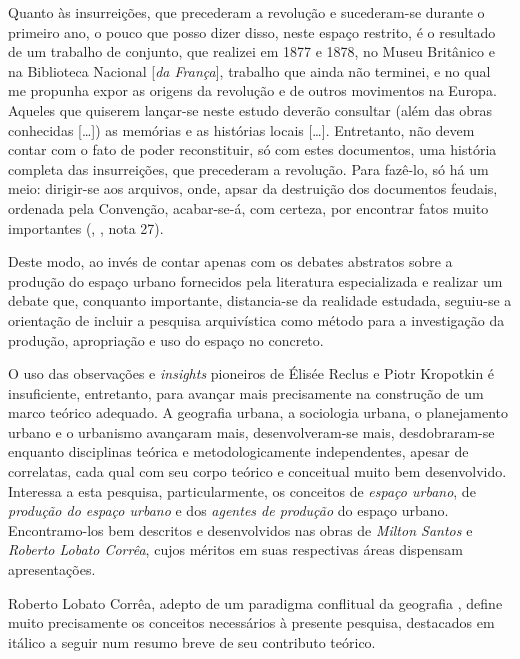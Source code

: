 \begin{citacao}
Quanto às insurreições, que precederam a revolução e sucederam-se durante o primeiro ano, o pouco que posso dizer disso, neste espaço restrito, é o resultado de um trabalho de conjunto, que realizei em 1877 e 1878, no Museu Britânico e na Biblioteca Nacional [\textit{da França}], trabalho que ainda não terminei, e no qual me propunha expor as origens da revolução e de outros movimentos na Europa. Aqueles que quiserem lançar-se neste estudo deverão consultar (além das obras conhecidas [{\dots}]) as memórias e as histórias locais [{\dots}]. Entretanto, não devem contar com o fato de poder reconstituir, só com estes documentos, uma história completa das insurreições, que precederam a revolução. Para fazê-lo, só há um meio: dirigir-se aos arquivos, onde, apsar da destruição dos documentos feudais, ordenada pela Convenção, acabar-se-á, com certeza, por encontrar fatos muito importantes (\citeauthor{KROPOTKIN2005f}, \citeyear{KROPOTKIN2005f},  nota 27).
\end{citacao}

Deste modo, ao invés de contar apenas com os debates abstratos sobre a produção do espaço urbano fornecidos pela literatura especializada e realizar um debate que, conquanto importante, distancia-se da realidade estudada, seguiu-se a orientação de incluir a pesquisa arquivística como método para a investigação da produção, apropriação e uso do espaço no concreto.

O uso das observações e \textit{insights} pioneiros de Élisée Reclus e Piotr Kropotkin é insuficiente, entretanto, para avançar mais precisamente na construção de um marco teórico adequado. A geografia urbana, a sociologia urbana, o planejamento urbano e o urbanismo avançaram mais, desenvolveram-se mais, desdobraram-se enquanto disciplinas teórica e metodologicamente independentes, apesar de correlatas, cada qual com seu corpo teórico e conceitual muito bem desenvolvido. Interessa a esta pesquisa, particularmente, os conceitos de \textit{espaço urbano}, de \textit{produção do espaço urbano} e dos \textit{agentes de produção} do espaço urbano. Encontramo-los bem descritos e desenvolvidos nas obras de \textit{Milton Santos} e \textit{Roberto Lobato Corrêa}, cujos méritos em suas respectivas áreas dispensam apresentações.

Roberto Lobato Corrêa, adepto de um paradigma conflitual da geografia \cite[p.~6]{CORREA1985espa}, define muito precisamente os conceitos necessários à presente pesquisa, destacados em itálico a seguir num resumo breve de seu contributo teórico. 

